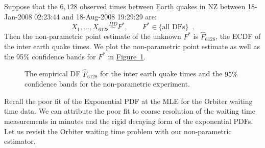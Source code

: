 \begin{labwork}\label{LW:NZSIEQTimesECDFsConfBands}
Suppose that the $6,128$ observed times between Earth quakes in  NZ between 18-Jan-2008 02:23:44 and 18-Aug-2008 19:29:29 are:
$$X_1,\ldots,X_{6128} \overset{IID}{\sim} F^*, \qquad F^* \in \{ \text{all DFs} \} \enspace .$$
Then the non-parametric point estimate of the unknown $F^*$ is $\widehat{F}_{6128}$, the ECDF of the inter earth quake times.  We plot the non-parametric point estimate as well as the 95\% confidence bands for $F^*$ in  \hyperref[F:NZSIEQTimesECDFsConfBands]{Figure~\ref*{F:NZSIEQTimesECDFsConfBands}}.
\begin{figure}[htpb]
\caption{The empirical DF $\widehat{F}_{6128}$ for the inter earth quake times and the $95\%$ confidence bands for the non-parametric experiment.  \label{F:NZSIEQTimesECDFsConfBands}}
\centering   {}
\end{figure}
\end{labwork}

Recall the poor fit of the Exponential PDF at the MLE for the Orbiter waiting time data.  We can attribute the poor fit to coarse resolution of the waiting time measurements in minutes and the rigid decaying form of the exponential PDFs.  Let us revisit the Orbiter waiting time problem with our non-parametric estimator.  

